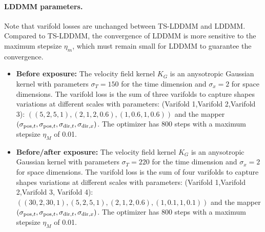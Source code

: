 \paragraph{LDDMM parameters.} Note that varifold losses are unchanged between TS-LDDMM and LDDMM. Compared to TS-LDDMM, the convergence of LDDMM is more sensitive to the maximum stepsize $\eta_m$, which must remain small for LDDMM to guarantee the convergence.
\begin{itemize}
  \item \textbf{Before exposure:} The velocity field kernel $K_G$ is an anysotropic Gaussian kernel with parameters $\sigma_{T} =150$ for the time dimension and $\sigma_x = 2$ for space dimensions. 
  The varifold loss is the sum of three varifolds to capture shapes variations at different scales with parameters: (Varifold 1,Varifold 2,Varifold 3): $\left((5,2,5,1),(2,1,2,0.6),(1,0.6,1,0.6)\right)$ and the mapper $(\sigma_{\mathrm{pos},t}, \sigma_{\mathrm{pos},t}, \sigma_{\mathrm{dir},t}, \sigma_{\mathrm{dir},x})$. The optimizer has 800 steps with a maximum stepsize $\eta_M$ of 0.01.
  \item \textbf{Before/after exposure:} The velocity field kernel $K_G$ is an anysotropic Gaussian kernel with parameters $\sigma_{T} =220$ for the time dimension and $\sigma_x = 2$ for space dimensions.
  The varifold loss is the sum of four varifolds to capture shapes variations at different scales with parameters: (Varifold 1,Varifold 2,Varifold 3, Varifold 4): $\left((30,2,30,1),(5,2,5,1),(2,1,2,0.6),(1,0.1,1,0.1)\right)$ and the mapper $(\sigma_{\mathrm{pos},t}, \sigma_{\mathrm{pos},t}, \sigma_{\mathrm{dir},t}, \sigma_{\mathrm{dir},x})$. The optimizer has 800 steps with a maximum stepsize $\eta_M$ of 0.01.
\end{itemize}

